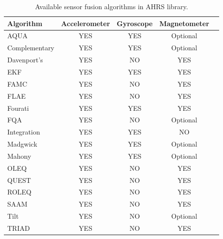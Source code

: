\begin{table}
    \begin{center}
        \begin{tabular}[t]{lcccc}
            \hline
            Algorithm     & Accelerometer & Gyroscope & Magnetometer \\
            \hline
            AQUA          & YES           & YES       & Optional     \\
            Complementary & YES           & YES       & Optional     \\
            Davenport’s   & YES           & NO        & YES          \\
            EKF           & YES           & YES       & YES          \\
            FAMC          & YES           & NO        & YES          \\
            FLAE          & YES           & NO        & YES          \\
            Fourati       & YES           & YES       & YES          \\
            FQA           & YES           & NO        & Optional     \\
            Integration   & YES           & YES       & NO           \\
            Madgwick      & YES           & YES       & Optional     \\
            Mahony        & YES           & YES       & Optional     \\
            OLEQ          & YES           & NO        & YES          \\
            QUEST         & YES           & NO        & YES          \\
            ROLEQ         & YES           & NO        & YES          \\
            SAAM          & YES           & NO        & YES          \\
            Tilt          & YES           & NO        & Optional     \\
            TRIAD         & YES           & NO        & YES          \\
            \hline
        \end{tabular}
        \caption{Available sensor fusion algorithms in AHRS library. }
        \label{tab:ahrs_algorithms}
    \end{center}
\end{table}

